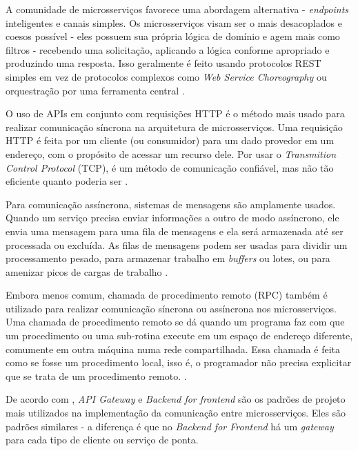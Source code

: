 A comunidade de microsserviços favorece uma abordagem alternativa - \emph{endpoints} inteligentes e canais simples. Os microsserviços visam ser o mais desacoplados e coesos possível - eles possuem sua própria lógica de domínio e agem mais como filtros - recebendo uma solicitação, aplicando a lógica conforme apropriado e produzindo uma resposta. Isso geralmente é feito usando protocolos REST simples em vez de protocolos complexos como \emph{Web Service Choreography} ou orquestração por uma ferramenta central \cite{martin-fowler-microservices}.

O uso de APIs em conjunto com requisições HTTP é o método mais usado para realizar comunicação síncrona na arquitetura de microsserviços. Uma requisição HTTP é feita por um cliente (ou consumidor) para um dado provedor em um endereço, com o propósito de acessar um recurso dele. Por usar o \emph{Transmition Control Protocol} (TCP), é um método de comunicação confiável, mas não tão eficiente quanto poderia ser \cite{martin-fowler-microservices}.

Para comunicação assíncrona, sistemas de mensagens são amplamente usados. Quando um serviço precisa enviar informações a outro de modo assíncrono, ele envia uma mensagem para uma fila de mensagens e ela será armazenada até ser processada ou excluída. As filas de mensagens podem ser usadas para dividir um processamento pesado, para armazenar trabalho em \emph{buffers} ou lotes, ou para amenizar picos de cargas de trabalho \cite{amazon-filas-de-mensagens}.

Embora menos comum, chamada de procedimento remoto (RPC) também é utilizado para realizar comunicação síncrona ou assíncrona nos microsserviços. Uma chamada de procedimento remoto se dá quando um programa faz com que um procedimento ou uma sub-rotina execute em um espaço de endereço diferente, comumente em outra máquina numa rede compartilhada. Essa chamada é feita como se fosse um procedimento local, isso é, o programador não precisa explicitar que se trata de um procedimento remoto. \cite{microsoft-grpc}.

De acordo com , \emph{API Gateway} e \emph{Backend for frontend} são os padrões de projeto mais utilizados na implementação da comunicação entre microsserviços. Eles são padrões similares - a diferença é que no \emph{Backend for Frontend} há um \emph{gateway} para cada tipo de cliente ou serviço de ponta.


